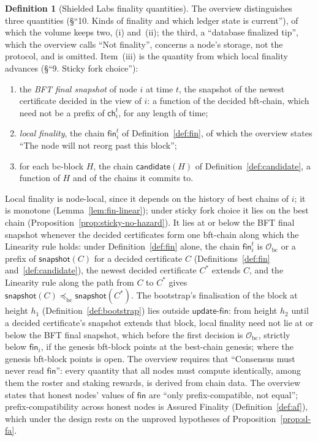 \documentclass[11pt,a4paper]{article}
\theoremstyle{definition}
\newtheorem{definition}[theorem]{Definition}
\newcommand{\bc}{\mathrm{bc}}
\newcommand{\Origin}{\mathcal{O}}
\newcommand{\Obc}{\Origin_{\bc}}
\newcommand{\preceqbc}{\preceq_{\bc}}
\newcommand{\ch}{\mathsf{ch}}
\newcommand{\snapshot}{\mathsf{snapshot}}
\newcommand{\candidate}{\mathsf{candidate}}
\newcommand{\fin}{\mathsf{fin}}
\newcommand{\updatefin}{\mathsf{update\text{-}fin}}
\begin{document}
\begin{definition}[Shielded Labs finality quantities]\label{def:sl-quantities}
The overview distinguishes three quantities (\S``10. Kinds of finality and
which ledger state is current''), of which the volume keeps two, (i)
and~(ii); the third, a ``database finalized tip'', which the overview calls
``Not finality'', concerns a node's storage, not the protocol, and is
omitted. Item~(iii) is the quantity from which local finality advances
(\S``9. Sticky fork choice''):
\begin{enumerate}[label=(\roman*)]
\item the \emph{BFT final snapshot} of node $i$ at time $t$, the snapshot
  of the newest certificate decided in the view of $i$: a function of the
  decided bft-chain, which need not be a prefix of $\ch_i^t$, for any
  length of time;
\item \emph{local finality}, the chain $\fin_i^t$ of
  Definition~\ref{def:fin}, of which the overview states ``The node will not
  reorg past this block'';
\item for each bc-block $H$, the chain $\candidate(H)$ of
  Definition~\ref{def:candidate}, a function of $H$ and of the chains it
  commits to.
\end{enumerate}
\end{definition}

Local finality is node-local, since it depends on the history of best chains of
$i$; it is monotone (Lemma~\ref{lem:fin-linear}); under sticky fork choice it
lies on the best chain (Proposition~\ref{prop:sticky-no-hazard}). It lies at or
below the BFT final snapshot whenever the decided certificates form one
bft-chain along which the Linearity rule holds: under Definition~\ref{def:fin}
alone, the chain $\fin_i^t$ is $\Obc$ or a prefix of $\snapshot(C)$ for a
decided certificate $C$ (Definitions~\ref{def:fin} and~\ref{def:candidate}), the
newest decided certificate $C^*$ extends $C$, and the Linearity rule along
the path from $C$ to $C^*$ gives $\snapshot(C) \preceqbc \snapshot(C^*)$.
The bootstrap's finalisation of the block at height $h_1$
(Definition~\ref{def:bootstrap}) lies outside $\updatefin$: from height
$h_2$ until a decided certificate's snapshot extends that block, local
finality need not lie at or below the BFT final snapshot, which before the
first decision is $\Obc$, strictly below $\fin_i$, if the genesis bft-block
points at the best-chain genesis; where the genesis bft-block points is open.
The overview requires that ``Consensus must never read $\fin$'': every quantity
that all nodes must compute identically, among them the roster and staking
rewards, is derived from chain data. The overview states that honest nodes'
values of $\fin$ are ``only prefix-compatible, not equal''; prefix-compatibility
across honest nodes is Assured Finality (Definition~\ref{def:af}), which under
the design rests on the unproved hypotheses of Proposition~\ref{prop:sl-fa}.
\end{document}
